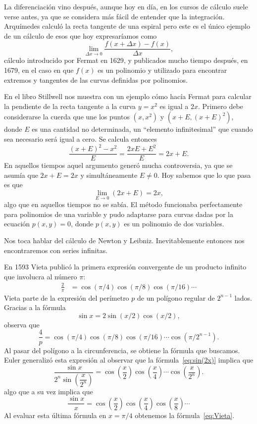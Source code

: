 
La diferenciación vino después, aunque hoy en día, en los cursos de cálculo
suele verse antes, ya que se considera más fácil de entender que la
integración.  Arquímedes calculó la recta tangente de una espiral pero este es el único ejemplo de un cálculo de
esos que hoy expresaríamos como
\[
	\lim_{\Delta x\to 0}\frac{f(x+\Delta x)-f(x)}{\Delta x},
\]
cálculo introducido por Fermat en 1629, y publicados mucho tiempo después, en
1679, en el caso en que $f(x)$ es un polinomio y utilizado para encontrar
extremos y tangentes de las curvas definidas por polinomios. 

En el libro \cite{MR2667826} Stillwell nos
muestra con un ejemplo cómo hacía Fermat para calcular la pendiente de la recta
tangente a la curva $y=x^2$ es igual a $2x$. Primero debe considerarse la
cuerda que une los puntos $(x,x^2)$ y $(x+E,(x+E)^2)$, donde $E$ es una
cantidad no determinada, un ``elemento infinitesimal'' que cuando sea necesario
será igual a cero. 
Se calcula entonces
\[
	\frac{(x+E)^2-x^2}{E}=\frac{2xE+E^2}{E}=2x+E.
\]
En aquellos tiempos aquel argumento generó mucha controversia, ya que se asumía que
$2x+E=2x$ y simultáneamente $E\ne 0$. Hoy sabemos que lo que pasa es que 
\[
	\lim_{E\to 0}(2x+E)=2x,
\]
algo que en aquellos tiempos no se sabía. El método funcionaba perfectamente
para polinomios de una variable y pudo adaptarse para curvas dadas por la
ecuación $p(x,y)=0$, donde $p(x,y)$ es un polinomio de dos variables. 

Nos toca hablar del cálculo de Newton y Leibniz. Inevitablemente entonces nos encontraremos 
con series infinitas. 

En 1593 Vieta publicó la primera expresión convergente de un producto
infinito que involucra al número $\pi$:
\begin{align}
	\label{eq:Vieta}
	\frac{2}{\pi}&=\cos(\pi/4)\cos(\pi/8)\cos(\pi/16)\cdots
\end{align}
Vieta parte de la expresión
del perímetro $p$ de un polígono regular de $2^{n-1}$ lados.  Gracias
a la fórmula 
\begin{equation}
	\label{eq:sin(2x)}
	\sin x=2\sin(x/2)\cos(x/2), 
\end{equation}
observa que
\[
	\frac{4}{p}=\cos(\pi/4)\cos(\pi/8)\cos(\pi/16)\cdots\cos(\pi/2^{n-1}).
\]
Al pasar del polígono a la circunferencia, se obtiene la fórmula que buscamos.
Euler generalizó esta expresión al observar que la fórmula~\eqref{eq:sin(2x)}
implica que 
\[
	\dfrac{\sin x}{2^n\sin\left(\dfrac{x}{2^n}\right)}
	=\cos\left(\dfrac{x}{2}\right)\cos\left(\dfrac{x}{4}\right)\cdots\cos\left(\dfrac{x}{2^n}\right).
\]
algo que a su vez implica que 
\[
	\frac{\sin x}{x}
	=\cos\left(\dfrac{x}{2}\right)\cos\left(\dfrac{x}{4}\right) \cos\left(\dfrac{x}{8}\right)\cdots
\]
Al evaluar esta última fórmula en $x=\pi/4$ obtenemos la fórmula~\eqref{eq:Vieta}. 

